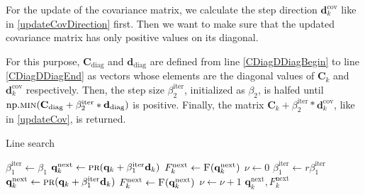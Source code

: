 For the update of the covariance matrix, we calculate the step direction $\mathbf{d}^\mathrm{cov}_k$ like in \ref{updateCovDirection} first. Then we want to make sure that the updated covariance matrix has only positive values on its diagonal.

For this purpose, $\mathbf{C}_\mathrm{diag}$ and $\mathbf{d}_\mathrm{diag}$ are defined from line \ref{CDiagDDiagBegin} to line \ref{CDiagDDiagEnd} as vectors whose elements are the diagonal values of $\mathbf{C}_k$ and $\mathbf{d}^\mathrm{cov}_k$ respectively. Then, the step size $\beta^\mathrm{iter}_2$, initialized as $\beta_2$, is halfed until $\mathrm{np.}\Call{min}{\mathbf{C}_\mathrm{diag}+\beta^\mathrm{iter}_2*\mathbf{d}_\mathrm{diag}}$ is positive. Finally, the matrix $\mathbf{C}_k+\beta^\mathrm{iter}_2*\mathbf{d}^\mathrm{cov}_k$, like in \eqref{updateCov}, is returned.

\begin{algorithm}[H]%
\caption{\label{LineSearchAlg}Line search}
\begin{algorithmic}[1]
\State $\beta^\mathrm{iter}_1 \gets \beta_1$
\State $\mathbf{q}^\mathrm{next}_k \gets \Call{pr}{\mathbf{q}_k+\beta^\mathrm{iter}_1\mathbf{d}_k}$
\State \label{LineSearchAlgFOMCall1}$F^\mathrm{next}_k \gets \Call{F}{\mathbf{q}^\mathrm{next}_k}$
\State $\nu \gets 0$
\State $\beta^\mathrm{iter}_1 \gets r\beta^\mathrm{iter}_1$
\State $\mathbf{q}^\mathrm{next}_k \gets \Call{pr}{\mathbf{q}_k+\beta^\mathrm{iter}_1\mathbf{d}_k}$
\State \label{LineSearchAlgFOMCall2}$F^\mathrm{next}_k \gets \Call{F}{\mathbf{q}^\mathrm{next}_k}$
\State $\nu \gets \nu+1$
\EndWhile
\Return $\mathbf{q}^\mathrm{next}_k, F^\mathrm{next}_k$
\EndFunction
\end{algorithmic}
\end{algorithm}

